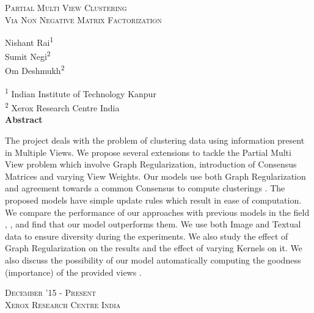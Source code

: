 \documentclass[a4paper]{article}
\begin{document}
	\begin{titlepage}
	    \begin{center}
	        \vspace*{1cm}
	        
	       	\huge{\textsc{Partial Multi View Clustering}}\\
			\Large{\textsc{Via Non Negative Matrix Factorization}}	

	        \vspace{8mm}
	        \large{Nishant Rai\textsuperscript{1}}\\
			\large{Sumit Negi\textsuperscript{2}}\\
			\large{Om Deshmukh\textsuperscript{2}}\\
			\vspace{3mm}
			
			{\normalsize{\textsuperscript{1} Indian Institute of Technology Kanpur\\}}
			{\normalsize{\textsuperscript{2} Xerox Research Centre India\\}}
	        \vspace{4mm}
        	\vspace{7mm}
	        \textbf{Abstract\\}
        	\vspace{4mm}
        	\noindent
{\justifying\small{The project deals with the problem of clustering data using information present in Multiple Views. We propose several extensions to tackle the Partial Multi View problem which involve Graph Regularization, introduction of Consensus Matrices and varying View Weights. Our models use both Graph Regularization \cite{GReg} and agreement towards a common Consensus to compute clusterings \cite{nmfsdm}. The proposed models have simple update rules which result in ease of computation. We compare the performance of our approaches with previous models in the field \cite{GReg}, \cite{nmfsdm}, \cite{pvc15} and find that our model outperforms them. We use both Image and Textual data \cite{greene2009matrix} to ensure diversity during the experiments. We also study the effect of Graph Regularization on the results and the effect of varying Kernels on it. We also discuss the possibility of our model automatically computing the goodness (importance) of the provided views \cite{cai2013multi}.} \par}
			\vfill
            \vspace{3mm}
            \large\textsc{December '15 - Present\\}
            \vspace{1mm}
            \large\textsc{Xerox Research Centre India}
	    \end{center}
	\end{titlepage}
	\restoregeometry
\end{document}
